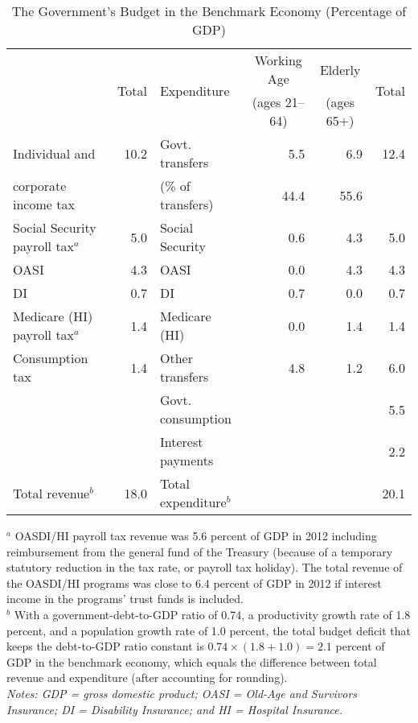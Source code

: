 \documentclass[11pt,leqno,fleqn]{article}
\begin{document}
\begin{table}[H]											
	\caption{The Government's Budget in the Benchmark Economy (Percentage of GDP)}											
	\label{T:Budget1}											
	\begin{center}											
		\begin{tabular*}{1.0\textwidth}{@{\extracolsep{\fill}}lr|lrrr}											
			\hline\hline\vphantom{\rule{0pt}{12.5pt}}%
			\multirow{2}{*}{Revenue}	&	\multirow{2}{*}{Total}	&	\multirow{2}{*}{Expenditure}	&	\multicolumn{1}{c}{Working Age}	&	\multicolumn{1}{c}{Elderly}	&	\multirow{2}{*}{Total}	\\
			&		&		&	\multicolumn{1}{c}{(ages 21--64)}	&	\multicolumn{1}{c}{(ages 65+)}	&	\phantom{(ages 65)}	\\
			\hline\vphantom{\rule{0pt}{12pt}}%
			Individual and	&	10.2	&	Govt. transfers	&	5.5	&	6.9	&	12.4	\\
			\quad corporate income tax	&		&	 (\% of transfers)	&	44.4	&	55.6	&		\\
			Social Security payroll tax$^{a}$	&	5.0	&	\quad Social Security	&	0.6	&	4.3	&	5.0	\\
			\quad OASI	&	4.3	&	\qquad OASI	&	0.0	&	4.3	&	4.3	\\
			\quad DI	&	0.7	&	\qquad DI	&	0.7	&	0.0	&	0.7	\\
			Medicare (HI) payroll tax$^{a}$&	1.4	&	\quad Medicare (HI)	&	0.0	&	1.4	&	1.4	\\
			Consumption tax 	&	1.4	&	\quad Other transfers	&	4.8	&	1.2	&	6.0	\\
			&		&	Govt. consumption	&		&		&	5.5	\\
			&		&	Interest payments	&		&		&	2.2	\\
			Total revenue$^{b}$	&	18.0	&	Total expenditure$^{b}$	&		&		&	20.1	\\
			\hline\hline											
		\end{tabular*}											
	\end{center}											
	\small $^{a}$ OASDI/HI payroll tax revenue was 5.6 percent of GDP in 2012 including reimbursement from the general fund of the Treasury (because of a temporary statutory reduction in the tax rate, or payroll tax holiday). The total revenue of the OASDI/HI programs was close to 6.4 percent of GDP in 2012 if interest income in the programs' trust funds is included.\\
	$^{b}$ With a government-debt-to-GDP ratio of 0.74, a productivity growth rate of 1.8 percent, and a population growth rate of 1.0 percent, the total budget deficit that keeps the debt-to-GDP ratio constant is $0.74\times(1.8+1.0)=2.1$ percent of GDP in the benchmark economy, which equals the difference between total revenue and expenditure (after accounting for rounding). \\
	\itshape Notes\normalfont :  GDP = gross domestic product; OASI = Old-Age and Survivors Insurance; DI = Disability Insurance; and HI = Hospital Insurance.\\											
\end{table}										
\end{document}
